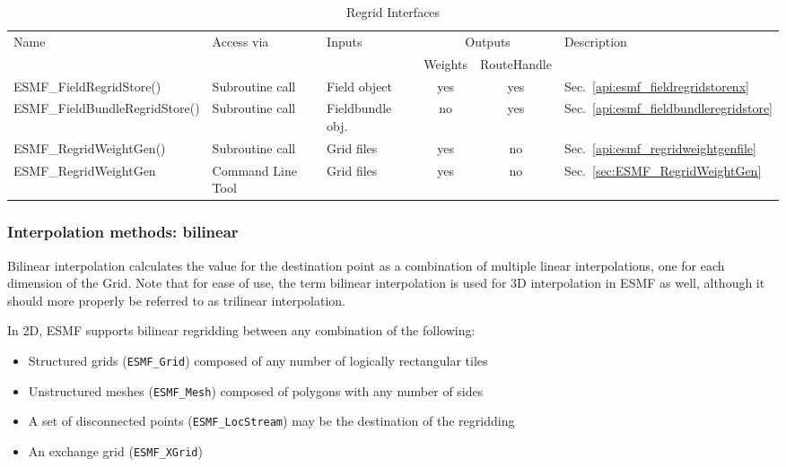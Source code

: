\begin{table}[ht]
\centering
\vspace{0.2cm}
\begin{tabular}{| l | l | l | c | c | l |}
\hline
Name & Access via & Inputs & \multicolumn{2}{|c|}{Outputs} & Description\\ 
     &            &        &  Weights & RouteHandle        &            \\ 
\hline
ESMF\_FieldRegridStore() & Subroutine call & Field object & yes  & yes & Sec.~\ref{api:esmf_fieldregridstorenx} \\
\hline
ESMF\_FieldBundleRegridStore() & Subroutine call & Fieldbundle obj. & no  & yes & Sec.~\ref{api:esmf_fieldbundleregridstore} \\
\hline
ESMF\_RegridWeightGen() & Subroutine call & Grid files & yes  & no & Sec.~\ref{api:esmf_regridweightgenfile} \\
\hline
ESMF\_RegridWeightGen & Command Line Tool & Grid files & yes  & no & Sec.~\ref{sec:ESMF_RegridWeightGen} \\
\hline
\end{tabular}
\label{Regrid Interfaces}
\caption{Regrid Interfaces}
\end{table}



\subsubsection{Interpolation methods: bilinear}\label{sec:interpolation:bilinear}
 Bilinear interpolation calculates the value for the 
 destination point as a combination of multiple linear interpolations, one for each dimension of the Grid. Note that for ease of 
 use, the term bilinear interpolation is used for 3D interpolation in ESMF as well, although it should more properly be referred 
 to as trilinear interpolation.

\smallskip

 In 2D, ESMF supports bilinear regridding between any combination of the following:
 \begin{itemize}
 \item Structured grids ({\tt ESMF\_Grid}) composed of any number of logically rectangular tiles
 \item Unstructured meshes ({\tt ESMF\_Mesh}) composed of polygons with any number of sides
 \item A set of disconnected points ({\tt ESMF\_LocStream}) may be the destination of the regridding
 \item An exchange grid ({\tt ESMF\_XGrid})
 \end{itemize}

